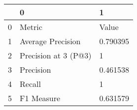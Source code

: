 \begin{tabular}{lll}
\toprule
{} &                     0 &         1 \\
\midrule
0 &                Metric &     Value \\
1 &     Average Precision &  0.790395 \\
2 &  Precision at 3 (P@3) &         1 \\
3 &             Precision &  0.461538 \\
4 &                Recall &         1 \\
5 &            F1 Measure &  0.631579 \\
\bottomrule
\end{tabular}

